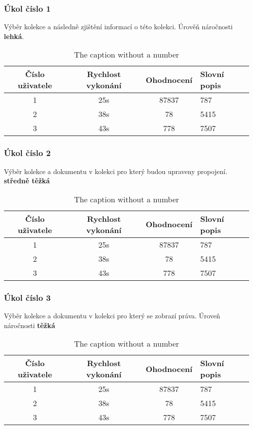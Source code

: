 \subsubsection{Úkol číslo 1} Výběr kolekce a následně zjištění informací o této kolekci. Úrověň náročnosti \textbf{lehká}.
\begin{table}[htp]
\begin{center}
\begin{tabular}{ || c || c | c |  m{5cm} || } 
 \hline
 Číslo uživatele & Rychlost vykonání & Ohodnocení & Slovní popis \\ [0.5ex] 
 \hline
 \hline
 1 & 25s & 87837 & 787 \\ 
 \hline
 2 & 38s & 78 & 5415 \\
 \hline
 3 & 43s & 778 & 7507 \\
 \hline
\end{tabular}
\end{center}
\caption{The caption without a number}
\end{table}
\subsubsection{Úkol číslo 2} Výběr kolekce a dokumentu v kolekci pro který budou upraveny propojení. \textbf{středně těžká}
\begin{table}[htp]
\begin{center}
\begin{tabular}{ || c || c | c |  m{5cm} || } 
 \hline
 Číslo uživatele & Rychlost vykonání & Ohodnocení & Slovní popis \\ [0.5ex] 
 \hline
 \hline
 1 & 25s & 87837 & 787 \\ 
 \hline
 2 & 38s & 78 & 5415 \\
 \hline
 3 & 43s & 778 & 7507 \\
 \hline
\end{tabular}
\end{center}
\caption{The caption without a number}
\end{table}
\subsubsection{Úkol číslo 3} Výběr kolekce a dokumentu v kolekci pro který se zobrazí práva. Úroveň náročnosti \textbf{těžká}
\begin{table}[htp]
\begin{center}
\begin{tabular}{ || c || c | c |  m{5cm} || } 
 \hline
 Číslo uživatele & Rychlost vykonání & Ohodnocení & Slovní popis \\ [0.5ex] 
 \hline
 \hline
 1 & 25s & 87837 & 787 \\ 
 \hline
 2 & 38s & 78 & 5415 \\
 \hline
 3 & 43s & 778 & 7507 \\
 \hline
\end{tabular}
\end{center}
\caption{The caption without a number}
\end{table}

